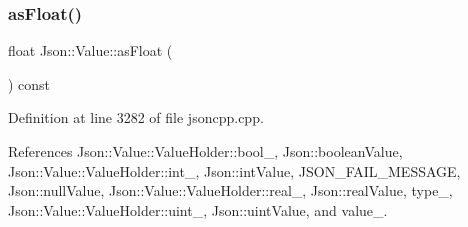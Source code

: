 \subsubsection{\texorpdfstring{as\+Float()}{asFloat()}}
{\footnotesize\ttfamily float Json\+::\+Value\+::as\+Float (\begin{DoxyParamCaption}{ }\end{DoxyParamCaption}) const}



Definition at line 3282 of file jsoncpp.\+cpp.



References Json\+::\+Value\+::\+Value\+Holder\+::bool\+\_\+, Json\+::boolean\+Value, Json\+::\+Value\+::\+Value\+Holder\+::int\+\_\+, Json\+::int\+Value, J\+S\+O\+N\+\_\+\+F\+A\+I\+L\+\_\+\+M\+E\+S\+S\+A\+GE, Json\+::null\+Value, Json\+::\+Value\+::\+Value\+Holder\+::real\+\_\+, Json\+::real\+Value, type\+\_\+, Json\+::\+Value\+::\+Value\+Holder\+::uint\+\_\+, Json\+::uint\+Value, and value\+\_\+.


